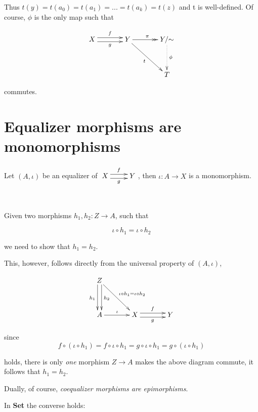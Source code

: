 \documentclass[a4paper]{amsart}            %
\makeatletter
\renewenvironment{proof}[1][\proofname]{\par
  \pushQED{\qed}%
  \normalfont \topsep6\p@\@plus6\p@\relax
  \trivlist
  \leftskip=0.6cm
  
  \item[\hskip\labelsep
        \itshape
    #1\@addpunct{.}]\mbox{ }\par\noindent%
  \leftskip=1cm
  \rightskip=1cm    
}{%
  \popQED\endtrivlist\@endpefalse
}
\theoremstyle{plain}                                               %
\makeatother
\begin{document}
Thus $t(y)=t(a_0)=t(a_1)=...=t(a_k)=t(z)$ and t is well-defined. Of course, $\phi$ is the only map such that 

\begin{align*} \xymatrix@+=1.25cm{X \ar@<0.66ex>[r]^f \ar@<-0.66ex>[r]_g & Y \ar[dr]_t \ar@{->>}[r]^{\pi} & Y/{\sim} \ar@{.>}[d]^{\phi}\\
																								&	&	 T } \end{align*}   	
																								
commutes.																								

\section*{\textbf{Equalizer morphisms are monomorphisms}}

Let $(A, \iota)$ be an equalizer of $\xymatrix{X \ar@<0.66ex>[r]^f \ar@<-0.66ex>[r]_g & Y}$, then $\iota: A \rightarrow X$ is a monomorphism.

\begin{proof}
Given two morphisms $h_1, h_2: Z \rightarrow A$, such that 

\begin{equation*}
\iota \circ h_1 = \iota \circ h_2
\end{equation*}

we need to show that $h_1 = h_2$.

This, however, follows directly from the universal property of $(A, \iota)$, 

\begin{align*}
\xymatrix@+=1.25cm{Z \ar@<-0.66ex>[d]_{h_1} \ar@<0.66ex>[d]^{h_2} \ar[rd]^{\iota \circ h_1 = \iota \circ h_2} & & \\
									 A \ar[r]^{\iota} & X \ar@<0.66ex>[r]^f \ar@<-0.66ex>[r]_g & Y}
\end{align*}

since 
\begin{equation*}
f \circ (\iota \circ h_1) = f \circ \iota \circ h_1 = g \circ \iota \circ h_1 = g \circ (\iota \circ h_1)
\end{equation*}

holds, there is only \emph{one} morphism $Z \rightarrow A$ makes the above diagram commute, it follows that $h_1 = h_2$.
\end{proof}

Dually, of course, \emph{coequalizer morphisms are epimorphisms}.

\bigskip

In \textbf{Set} the converse holds:
\end{document}
